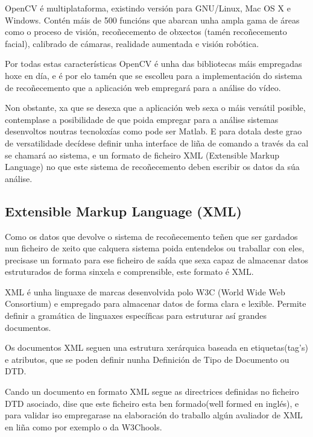     OpenCV é multiplataforma, existindo versión para GNU/Linux, Mac OS X e Windows. Contén máis 
    de 500 funcións que abarcan unha ampla gama de áreas como o proceso de visión, recoñecemento
    de obxectos (tamén recoñecemento facial), calibrado de cámaras, realidade aumentada e visión
    robótica.
    
    Por todas estas características OpenCV é unha das bibliotecas máis empregadas hoxe en día, e é
    por elo tamén que se escolleu para a implementación do sistema de recoñecemento que a aplicación
    web empregará para a análise do vídeo.
    
    Non obstante, xa que se desexa que a aplicación web sexa o máis versátil posible, contemplase a
    posibilidade de que poida empregar para a análise sistemas desenvoltos noutras tecnoloxías como
    pode ser Matlab. E para dotala deste grao de versatilidade decídese definir unha interface de
    liña de comando a través da cal se chamará ao sistema, e un formato de ficheiro XML (Extensible 
    Markup Language) no que este sistema de recoñecemento deben escribir os datos da súa análise.
        
\subsection{Extensible Markup Language (XML)}
    
    Como os datos que devolve o sistema de recoñecemento teñen que ser gardados nun ficheiro de 
    xeito que calquera sistema poida entendelos ou traballar con eles, precisase un formato para
    ese ficheiro de saída que sexa capaz de almacenar datos estruturados de forma sinxela e 
    comprensible, este formato é XML.

    XML é unha linguaxe de marcas desenvolvida polo W3C (World Wide Web Consortium) e empregado
    para almacenar datos de forma clara e lexible. Permite definir a gramática de linguaxes 
    específicas para estruturar así grandes documentos.
    
    Os documentos XML seguen una estrutura xerárquica baseada en etiquetas(tag's) e atributos,
    que se poden definir nunha Definición de Tipo de Documento ou DTD. \cite{dtd-web-page}
    
    Cando un documento en formato XML segue as directrices definidas no ficheiro DTD asociado,
    dise que este ficheiro esta ben formado(well formed en inglés), e para validar iso empregarase
    na elaboración do traballo algún avaliador de XML en liña como por exemplo o da W3Chools.\cite{xml-validator}
    
